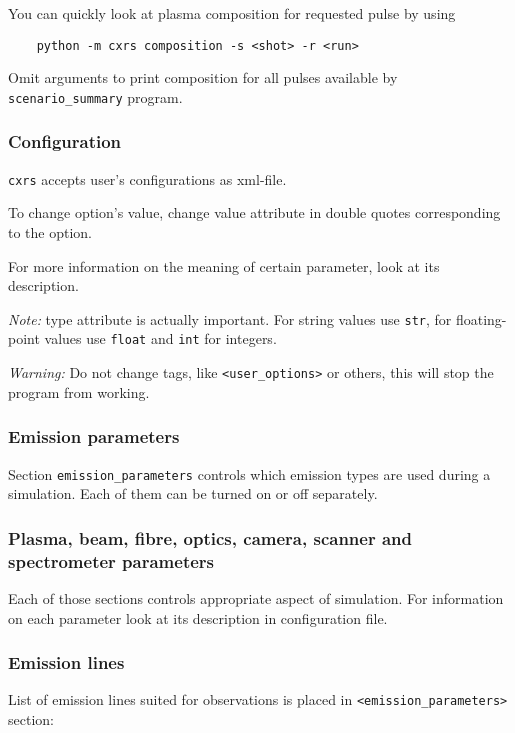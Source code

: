 \documentclass[../main.tex]{subfiles}
\begin{document}
You can quickly look at plasma composition for requested pulse by using

\begin{verbatim}
    python -m cxrs composition -s <shot> -r <run>
\end{verbatim}

Omit arguments to print composition for all pulses available by \texttt{scenario\_summary} program.

\subsubsection{Configuration}

\texttt{cxrs} accepts user's configurations as xml-file.

To change option's value, change value attribute in double quotes corresponding to the option.

For more information on the meaning of certain parameter, look at its description.

\emph{Note:} type attribute is actually important. For string values use \texttt{str}, for floating-point values use \texttt{float} and \texttt{int} for integers.

\emph{Warning:} Do not change tags, like \texttt{<user\_options>} or others, this will stop the program from working.

\subsubsection{Emission parameters}

Section \texttt{emission\_parameters} controls which emission types are used during a simulation. Each of them can be turned on or off separately.

\subsubsection{Plasma, beam, fibre, optics, camera, scanner and spectrometer parameters}

Each of those sections controls appropriate aspect of simulation. For information on each parameter look at its description in configuration file.

\subsubsection{Emission lines}

List of emission lines suited for observations is placed in \texttt{<emission\_parameters>} section:
\end{document}
